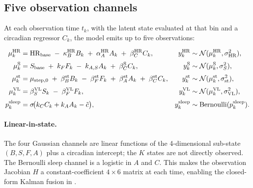\documentclass[11pt,a4paper]{article}
\theoremstyle{definition}
\newcommand{\Ncal}{\mathcal{N}}
\begin{document}
\subsection{Five observation channels}

At each observation time $t_k$, with the latent state evaluated at that
bin and a circadian regressor $C_k$, the model emits up to five
observations:

\begin{align}
\mu^{\rm HR}_k  &= {\rm HR}_{\rm base} \;-\; \kappa_B^{\rm HR} B_k \;+\; \alpha_A^{\rm HR} A_k \;+\; \beta_C^{\rm HR} C_k,
   & y^{\rm HR}_k  &\sim \Ncal(\mu^{\rm HR}_k, \sigma_{\rm HR}^2), \label{eq:obs-HR} \\[2pt]
\mu^{\rm S}_k   &= S_{\rm base} \;+\; k_F F_k \;-\; k_{A,S} A_k \;+\; \beta_C^{\rm S} C_k,
   & y^{\rm S}_k   &\sim \Ncal(\mu^{\rm S}_k,  \sigma_S^2), \label{eq:obs-S} \\[2pt]
\mu^{\rm st}_k  &= \mu_{\rm step,0} \;+\; \beta_B^{\rm st} B_k \;-\; \beta_F^{\rm st} F_k \;+\; \beta_A^{\rm st} A_k \;+\; \beta_C^{\rm st} C_k,
   & y^{\rm st}_k  &\sim \Ncal(\mu^{\rm st}_k, \sigma_{\rm st}^2), \label{eq:obs-st} \\[2pt]
\mu^{\rm VL}_k  &= \beta_S^{\rm VL} S_k \;-\; \beta_F^{\rm VL} F_k,
   & y^{\rm VL}_k  &\sim \Ncal(\mu^{\rm VL}_k, \sigma_{\rm VL}^2), \label{eq:obs-VL} \\[2pt]
p^{\rm sleep}_k &= \sigma\!\big(k_C C_k + k_A A_k - \tilde c\big),
   & y^{\rm sleep}_k &\sim \mathrm{Bernoulli}(p^{\rm sleep}_k). \label{eq:obs-sleep}
\end{align}

\paragraph{Linear-in-state.} The four Gaussian channels are linear
functions of the 4-dimensional sub-state $(B, S, F, A)$ plus a circadian
intercept; the $K$ states are not directly observed. The Bernoulli
sleep channel is a logistic in $A$ and $C$. This makes the observation
Jacobian $H$ a constant-coefficient $4 \times 6$ matrix at each time,
enabling the closed-form Kalman fusion in
.
\end{document}
